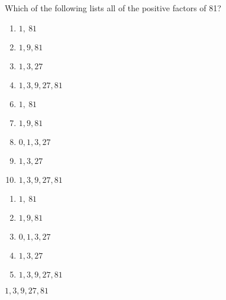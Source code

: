 
 Which of the following lists all of the positive factors of 81?


\ifsat
	\begin{enumerate}[label=\Alph*)]
		\item   $1,\  81$
		\item  $1, 9, 81$
		\item  $1, 3, 27$
		\item   $1, 3, 9, 27, 81$%
	\end{enumerate}
\else
\fi

\ifacteven
	\begin{enumerate}[label=\textbf{\Alph*.},itemsep=\fill,align=left]
		\setcounter{enumii}{5}
		\item   $1,\  81$
		\item  $1, 9, 81$
		\item  $0, 1, 3, 27$
		\addtocounter{enumii}{1}
		\item  $1, 3, 27$
		\item   $1, 3, 9, 27, 81$%
	\end{enumerate}
\else
\fi

\ifactodd
	\begin{enumerate}[label=\textbf{\Alph*.},itemsep=\fill,align=left]
		\item   $1,\  81$
		\item  $1, 9, 81$
		\item  $0, 1, 3, 27$
		\item  $1, 3, 27$
		\item   $1, 3, 9, 27, 81$%
	\end{enumerate}
\else
\fi

\ifgridin
   $1, 3, 9, 27, 81$%

\else
\fi

